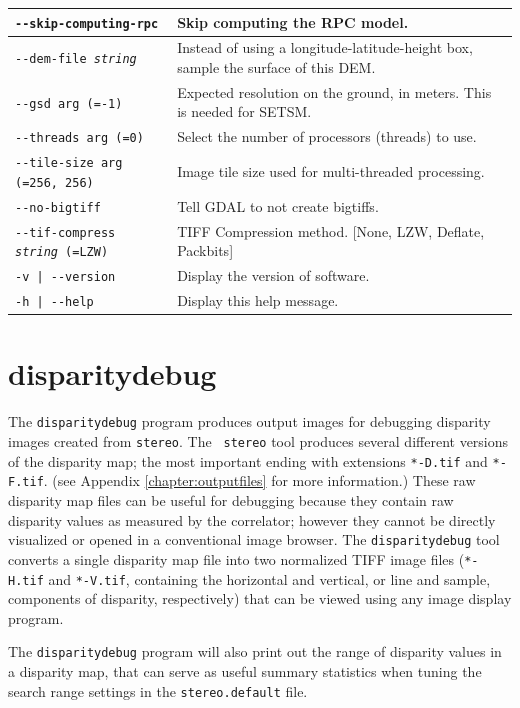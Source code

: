 \begin{longtable}{|l|p{7.0cm}|}
\texttt{-\/-skip-computing-rpc} & Skip computing the RPC model.\\ \hline
\texttt{-\/-dem-file \textit{string}} & Instead of using a longitude-latitude-height box, sample the surface of this DEM.\\ \hline
\texttt{-\/-gsd arg (=-1)} & Expected resolution on the ground, in meters. This is needed for SETSM.\\ \hline
\texttt{-\/-threads arg (=0)} & Select the number of processors (threads) to use.\\ \hline
\texttt{-\/-tile-size arg (=256, 256)} & Image tile size used for multi-threaded processing.\\ \hline
\texttt{-\/-no-bigtiff} & Tell GDAL to not create bigtiffs.\\ \hline
\texttt{-\/-tif-compress \textit{string} (=LZW)} & TIFF Compression method. [None, LZW, Deflate, Packbits]\\ \hline
\texttt{-v | -\/-version } & Display the version of software.\\ \hline
\texttt{-h | -\/-help } & Display this help message.\\ \hline
\end{longtable}


\clearpage

\section{disparitydebug}
\label{disparitydebug}

The \texttt{disparitydebug} program produces output images for
debugging disparity images created from \verb#stereo#. The {\tt
stereo} tool produces several different versions of the disparity
map; the most important ending with extensions \verb#*-D.tif# and
\verb#*-F.tif#. (see Appendix \ref{chapter:outputfiles} for more
information.)  These raw disparity map files can be useful for
debugging because they contain raw disparity values as measured by
the correlator; however they cannot be directly visualized or opened
in a conventional image browser.  The \verb#disparitydebug# tool
converts a single disparity map file into two normalized TIFF image
files (\verb#*-H.tif# and \verb#*-V.tif#, containing the horizontal
and vertical, or line and sample, components of disparity, respectively)
that can be viewed using any image display program.

The {\tt disparitydebug} program will also print out the range of
disparity values in a disparity map, that can serve as useful summary
statistics when tuning the search range settings in the
{\tt stereo.default} file.

